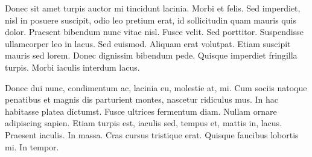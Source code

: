 \documentclass[12pt]{book}
\begin{document}
Donec sit amet turpis auctor mi tincidunt lacinia. Morbi et felis. Sed imperdiet, nisl in posuere suscipit, odio leo pretium erat, id sollicitudin quam mauris quis dolor. Praesent bibendum nunc vitae nisl. Fusce velit. Sed porttitor. Suspendisse ullamcorper leo in lacus. Sed euismod. Aliquam erat volutpat. Etiam suscipit mauris sed lorem. Donec dignissim bibendum pede. Quisque imperdiet fringilla turpis. Morbi iaculis interdum lacus.

Donec dui nunc, condimentum ac, lacinia eu, molestie at, mi. Cum sociis natoque penatibus et magnis dis parturient montes, nascetur ridiculus mus. In hac habitasse platea dictumst. Fusce ultrices fermentum diam. Nullam ornare adipiscing sapien. Etiam turpis est, iaculis sed, tempus et, mattis in, lacus. Praesent iaculis. In massa. Cras cursus tristique erat. Quisque faucibus lobortis mi. In tempor.
\end{document}
